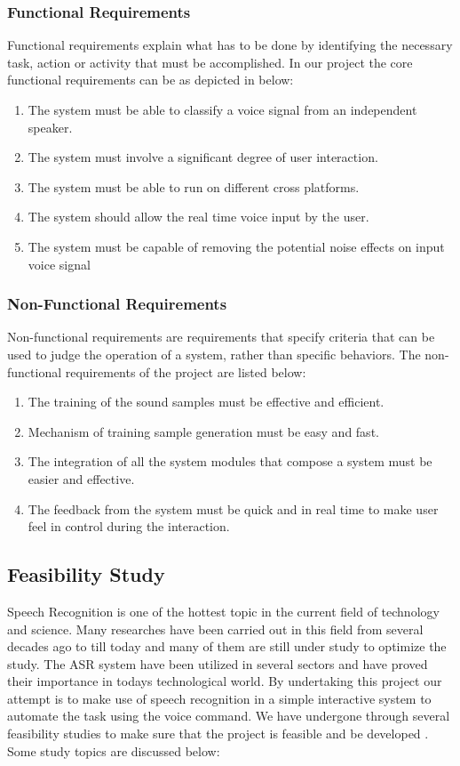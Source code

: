 \subsubsection{Functional Requirements}

Functional requirements explain what has to be done by identifying the necessary task, action or activity that must be accomplished. In our project the core functional requirements can be as depicted in below:
\begin{enumerate}
	\item The system must be able to classify a voice signal from an independent speaker.
	\item The system must involve a significant degree of user interaction.
	\item The system must be able to run on different cross platforms.
	\item The system should allow the real time voice input by the user.
	\item The system must be capable of removing the potential noise effects on input voice signal
	
\end{enumerate}

\subsubsection{Non-Functional Requirements}
Non-functional requirements are requirements that specify criteria that can be used to judge the operation of a system, rather than specific behaviors. The non-functional requirements of the project  are listed below:

\begin{enumerate}
	\item The training of the sound samples must be effective and efficient.
	\item Mechanism of training sample generation must be easy and fast.
	\item The integration of all the system modules that compose a system must be easier and effective.
	\item The feedback from the system must be quick and in real time to make user feel in control during the interaction.
	
	
	
\end{enumerate}


\subsection{Feasibility Study}
Speech Recognition is one of the hottest topic in the current field of technology and science. Many researches have been carried out in this field from several decades ago to till today and many of them are still under study to optimize the study. The ASR system have been utilized in several sectors and have proved their importance in today\textquotesingle s technological world. By undertaking this project our attempt is to make use of speech recognition in a simple interactive system to automate the task using the voice command. We have undergone through several feasibility studies to make sure that the project is feasible and be developed . Some study topics are discussed below:


